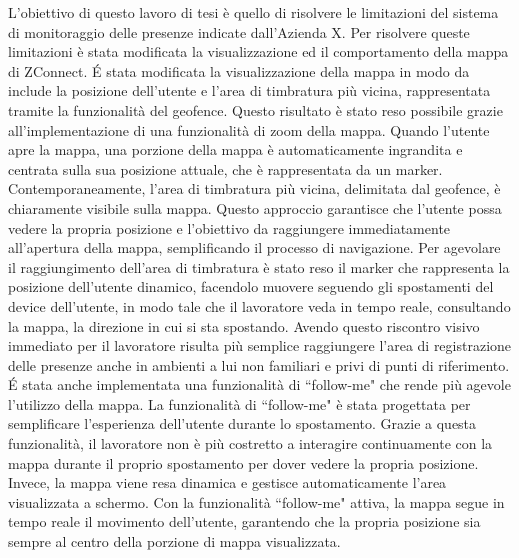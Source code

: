 L'obiettivo di questo lavoro di tesi è quello di risolvere le limitazioni del sistema di monitoraggio delle presenze indicate dall'Azienda X. Per risolvere queste limitazioni è stata modificata la visualizzazione ed il comportamento della mappa di ZConnect.
\'E stata modificata la visualizzazione della mappa in modo da include la posizione dell'utente e l'area di timbratura più vicina, rappresentata tramite la funzionalità del geofence. Questo risultato è stato reso possibile grazie all'implementazione di una funzionalità di zoom della mappa. Quando l'utente apre la mappa, una porzione della mappa è automaticamente ingrandita e centrata sulla sua posizione attuale, che è rappresentata da un marker. Contemporaneamente, l'area di timbratura più vicina, delimitata dal geofence, è chiaramente visibile sulla mappa. Questo approccio garantisce che l'utente possa vedere la propria posizione e l'obiettivo da raggiungere immediatamente all'apertura della mappa, semplificando il processo di navigazione.
Per agevolare il raggiungimento dell'area di timbratura è stato reso il marker che rappresenta la posizione dell'utente dinamico, facendolo muovere seguendo gli spostamenti del device dell'utente, in modo tale che il lavoratore veda in tempo reale, consultando la mappa, la direzione in cui si sta spostando. Avendo questo riscontro visivo immediato per il lavoratore risulta più semplice raggiungere l'area di registrazione delle presenze anche in ambienti a lui non familiari e privi di punti di riferimento.
\'E  stata anche implementata una funzionalità di ``follow-me" che rende più agevole l'utilizzo della mappa.
La funzionalità di ``follow-me" è stata progettata per semplificare l'esperienza dell'utente durante lo spostamento. Grazie a questa funzionalità, il lavoratore non è più costretto a interagire continuamente con la mappa durante il proprio spostamento per dover vedere la propria posizione. Invece, la mappa viene resa dinamica e gestisce automaticamente l'area visualizzata a schermo.
Con la funzionalità ``follow-me" attiva, la mappa segue in tempo reale il movimento dell'utente, garantendo che la propria posizione sia sempre al centro della porzione di mappa visualizzata.


